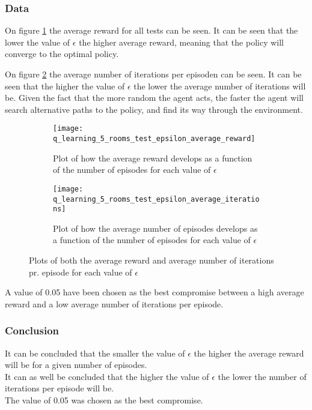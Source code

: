 \documentclass[../Head/Main.tex]{subfiles}
\begin{document}
\clearpage
\subsubsection{Data}
On figure \ref{fig:q-learn_epsilon_reward} the average reward for all tests can be seen. It can be seen that the lower the value of $\epsilon$ the higher average reward, meaning that the policy will converge to the optimal policy.\par
On figure \ref{fig:q-learn_epsilon_iterations} the average number of iterations per episoden can be seen. It can be seen that the higher the value of $\epsilon$ the lower the average number of iterations will be. Given the fact that the more random the agent acts, the faster the agent will search alternative paths to the policy, and find its way through the environment.  
\begin{figure}[H]
	\centering
	\begin{subfigure}[b]{0.49\textwidth}
		\centering
		\texttt{[image: q\_learning\_5\_rooms\_test\_epsilon\_average\_reward]}
		\caption{Plot of how the average reward develops as a function of the number of episodes for each value of $\epsilon$}
		\label{fig:q-learn_epsilon_reward}
	\end{subfigure}
	\hfill
	\begin{subfigure}[b]{0.49\textwidth}
		\centering
		\texttt{[image: q\_learning\_5\_rooms\_test\_epsilon\_average\_iterations]}
		\caption{Plot of how the average number of episodes develops as a function of the number of episodes for each value of $\epsilon$}
		\label{fig:q-learn_epsilon_iterations}
	\end{subfigure}
	\caption{Plots of both the average reward and average number of iterations pr. episode for each value of $\epsilon$}
	\label{fig:q-learn_epsilon}
\end{figure}
A value of 0.05 have been chosen as the best compromise between a high average reward and a low average number of iterations per episode.

\subsubsection{Conclusion}
It can be concluded that the smaller the value of $\epsilon$ the higher the average reward will be for a given number of episodes.\\
It can as well be concluded that the higher the value of $\epsilon$ the lower the number of iterations per episode will be.\\ 
The value of 0.05 was chosen as the best compromise.
\end{document}

